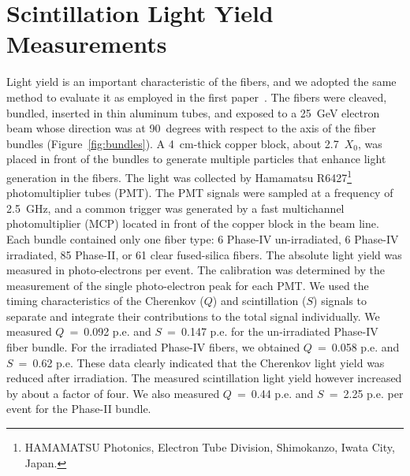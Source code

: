 \documentclass[a4paper,11pt]{article}
\begin{document}
\section{Scintillation Light Yield Measurements}
\label{sec:lightyield}
Light yield is an important characteristic of the fibers, and we adopted the same method to evaluate it as employed in the first paper~\cite{JINSTPaper}.   The fibers were cleaved, bundled, inserted in thin aluminum tubes, and exposed to a 25~GeV electron beam whose direction was at 90~degrees with respect to the axis of the fiber bundles (Figure~\ref{fig:bundles}). A 4~cm-thick copper block, about 2.7~$X_0$, was placed in front of the bundles to generate multiple particles that enhance light generation in the fibers. The light was collected by Hamamatsu R6427\footnote{HAMAMATSU Photonics, Electron Tube Division, Shimokanzo, Iwata City, Japan.} photomultiplier tubes (PMT). The PMT signals were sampled at a frequency of 2.5~GHz, and a common trigger was generated by a fast multichannel photomultiplier (MCP) located in front of the copper block in the beam line. Each bundle contained only one fiber type: 6 Phase-IV un-irradiated, 6 Phase-IV irradiated, 85 Phase-II, or 61 clear fused-silica fibers. The absolute light yield was measured in photo-electrons per event. The calibration was determined by the measurement of the single photo-electron peak for each PMT. We used the timing characteristics of the Cherenkov ($Q$) and scintillation ($S$) signals to separate and integrate their contributions to the total signal individually. We measured $Q$~=~0.092 p.e. and $S$~=~0.147 p.e. for the un-irradiated Phase-IV fiber bundle. For the irradiated Phase-IV fibers, we obtained $Q$~=~0.058 p.e. and $S$~=~0.62 p.e.  These data clearly indicated that the Cherenkov light yield was reduced after irradiation. The measured scintillation light yield however increased by about a factor of four. We also measured $Q$~=~0.44 p.e. and $S$~=~2.25 p.e. per event for the Phase-II bundle.
\end{document}
